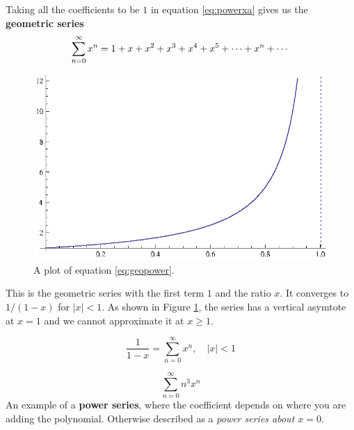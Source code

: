     Taking all the coefficients to be $1$ in equation \eqref{eq:powerxa}
    gives us the \textbf{geometric series}
    \begin{equation}\label{eq:geopower}
      \sum_{n=0}^{\infty} x^n = 1 + x + x^2 + x^3 + x^4 + x^5 + \cdots + x^n  + \cdots
    \end{equation}
    \begin{figure}[H]
      \begin{center}
        \includegraphics{continuous/series/geopower}
      \end{center}
      \caption{A plot of equation \eqref{eq:geopower}.\label{fig:geopower}}
    \end{figure}
    This is the geometric series with the first term $1$ and the ratio $x$.
    It converges to $1/(1-x)$ for $|x|<1.$ As shown in Figure
    \ref{fig:geopower}, the series has a vertical asymtote at $x=1$ and we
    cannot approximate it at $x \geq 1$.
    \begin{theorem}
      \label{th:recipowser}
      \begin{equation}
        \frac{1}{1-x} = \sum_{n=0}^{\infty}x^n, \quad |x| < 1
      \end{equation}
    \end{theorem}
\begin{ex}
  \[ \sum^\infty_{n=0} n^3 x^n   \]
  An example of a \textbf{power series}, where the coefficient depends on where
  you are adding the polynomial.\label{powerseriesex1}
  Otherwise described as a \emph{power series about \(x=0\)}.
\end{ex}

